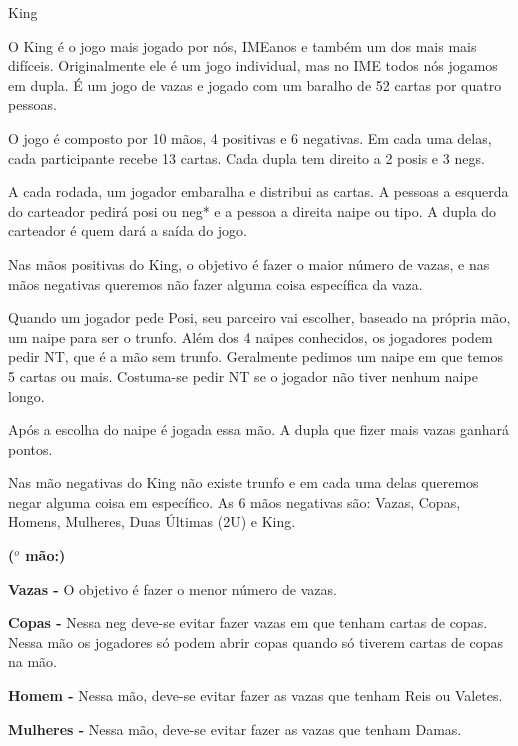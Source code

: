 \begin{subsecao}{King}

O King é o jogo mais jogado por nós, IMEanos e também um dos mais mais difíceis.
Originalmente ele é um jogo individual, mas no IME todos nós jogamos em
dupla. É um jogo de vazas e jogado com um baralho de 52 cartas por quatro
pessoas.

O jogo é composto por 10 mãos, 4 positivas e 6 negativas. Em cada uma delas,
cada participante recebe 13 cartas. Cada dupla tem direito a 2 posis e 3 negs.

A cada rodada, um jogador embaralha e distribui as cartas. A pessoas a esquerda
do carteador pedirá posi ou neg* e a pessoa a direita naipe ou tipo. A dupla do
carteador é quem dará a saída do jogo.

Nas mãos positivas do King, o objetivo é fazer o maior número de vazas, e nas
mãos negativas queremos não fazer alguma coisa específica da vaza.

Quando um jogador pede Posi, seu parceiro vai escolher, baseado na própria mão,
um naipe para ser o trunfo. Além dos 4 naipes conhecidos,  os jogadores podem
pedir NT, que é a mão sem trunfo. Geralmente pedimos um naipe em que temos 5
cartas ou mais. Costuma-se pedir NT se o jogador não tiver nenhum naipe longo.

Após a escolha do naipe é jogada essa mão. A dupla que fizer mais vazas ganhará
pontos.

Nas mão negativas do King não existe trunfo e em cada uma delas queremos negar
alguma coisa em específico. As 6 mãos negativas são: Vazas, Copas, Homens,
Mulheres, Duas Últimas (2U) e King.

\begin{list}{\textbf{ ($^{o}$ mão:)}}{}

\item \textbf{Vazas -} O objetivo é fazer o menor número de vazas.

\item \textbf{Copas -}  Nessa neg deve-se evitar fazer vazas em que tenham
cartas de copas. Nessa mão os jogadores só podem abrir copas quando só tiverem
cartas de copas na mão.

\item \textbf{Homem -} Nessa mão, deve-se evitar fazer as vazas que tenham Reis
ou Valetes.

\item \textbf{Mulheres -} Nessa mão, deve-se evitar fazer as vazas que tenham
Damas.


\end{list}
\end{subsecao}

